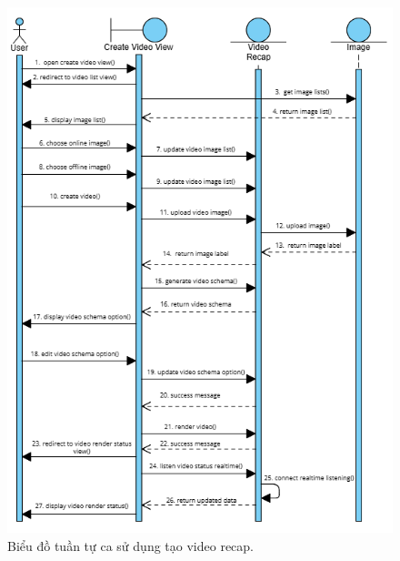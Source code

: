 \begin{figure}[H]
    \centering  
    \includegraphics[width=1.1\textwidth]{figures/c3/3-3-9-sequence-diagram.png}
    \caption{Biểu đồ tuần tự ca sử dụng tạo video recap.}
    \label{fig:3-3-9-sequence-diagram}
\end{figure}
